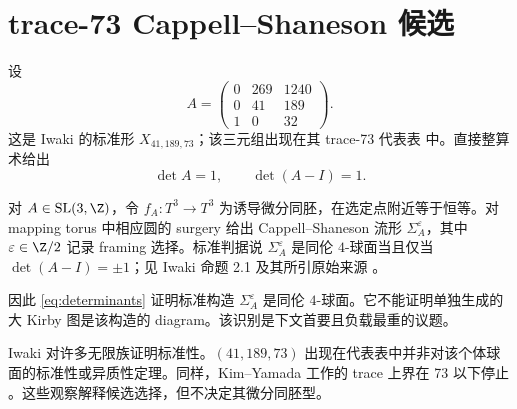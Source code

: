 \section{trace-73 Cappell--Shaneson 候选}

设
\begin{equation}\label{eq:A}
A=\begin{pmatrix}
0&269&1240\\
0&41&189\\
1&0&32
\end{pmatrix}.
\end{equation}
这是 Iwaki 的标准形 $X_{41,189,73}$；该三元组出现在其 trace-73 代表表 \cite[Table 2]{Iwaki2024} 中。直接整算术给出
\begin{equation}\label{eq:determinants}
\det A=1,\qquad \det(A-I)=1.
\end{equation}

对 $A\in \operatorname{SL}(3,\Z)$，令 $f_A:T^3\to T^3$ 为诱导微分同胚，在选定点附近等于恒等。对 mapping torus 中相应圆的 surgery 给出 Cappell--Shaneson 流形 $\Sigma_A^\varepsilon$，其中 $\varepsilon\in\Z/2$ 记录 framing 选择。标准判据说 $\Sigma_A^\varepsilon$ 是同伦 $4$-球面当且仅当 $\det(A-I)=\pm1$；见 Iwaki 命题 2.1 及其所引原始来源 \cite{Iwaki2024,CappellShaneson1976}。

因此 \eqref{eq:determinants} 证明标准构造 $\Sigma_A^\varepsilon$ 是同伦 $4$-球面。它不能证明单独生成的大 Kirby 图是该构造的 diagram。该识别是下文首要且负载最重的议题。

Iwaki 对许多无限族证明标准性。$(41,189,73)$ 出现在代表表中并非对该个体球面的标准性或异质性定理。同样，Kim--Yamada 工作的 trace 上界在 73 以下停止 \cite{KimYamada2017}。这些观察解释候选选择，但不决定其微分同胚型。
